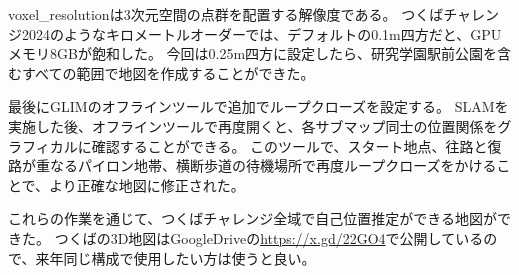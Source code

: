 voxel\_resolutionは3次元空間の点群を配置する解像度である。
つくばチャレンジ2024のようなキロメートルオーダーでは、デフォルトの0.1m四方だと、GPUメモリ8GBが飽和した。
今回は0.25m四方に設定したら、研究学園駅前公園を含むすべての範囲で地図を作成することができた。

最後にGLIMのオフラインツールで追加でループクローズを設定する。
SLAMを実施した後、オフラインツールで再度開くと、各サブマップ同士の位置関係をグラフィカルに確認することができる。
このツールで、スタート地点、往路と復路が重なるパイロン地帯、横断歩道の待機場所で再度ループクローズをかけることで、より正確な地図に修正された。

これらの作業を通じて、つくばチャレンジ全域で自己位置推定ができる地図ができた。
つくばの3D地図はGoogleDriveの\url{https://x.gd/22GO4}で公開しているので、来年同じ構成で使用したい方は使うと良い。